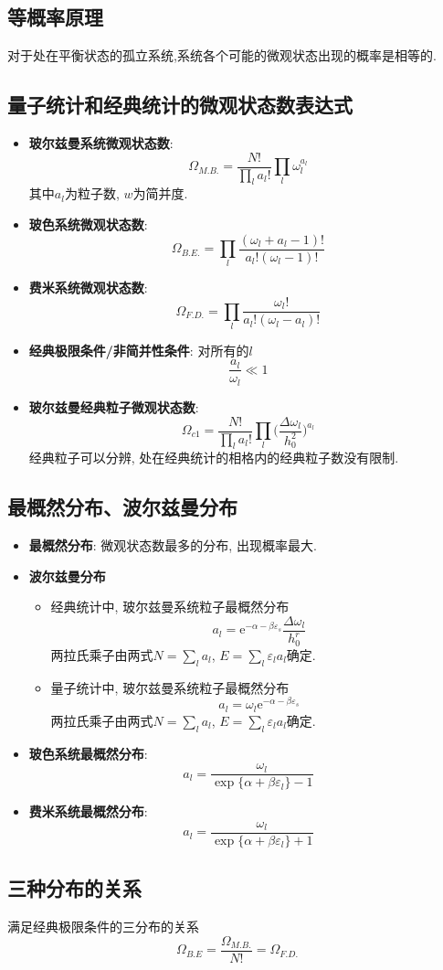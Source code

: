 
\subsection{等概率原理}
对于处在平衡状态的孤立系统,系统各个可能的微观状态出现的概率是相等的.


\subsection{量子统计和经典统计的微观状态数表达式}
\begin{itemize}
\item\textbf{玻尔兹曼系统微观状态数}:
\[
\Omega_{M.B.} = \frac{N!}{\prod\limits_l a_l !}\prod\limits_l \omega_l^{a_l}
\]
其中$a_l$为粒子数, $w$为简并度.
\item\textbf{玻色系统微观状态数}:
\[
\Omega_{B.E.} = \prod\limits_l \frac{(\omega_l + a_l - 1)!}{a_l!(\omega_l-1)!}
\]
\item\textbf{费米系统微观状态数}:
\[
\Omega_{F.D.} = \prod\limits_l \frac{\omega_l !}{a_l!(\omega_l-a_l)!}
\]
\item\textbf{经典极限条件/非简并性条件}: 对所有的$l$
\[
\frac{a_l}{\omega_l}\ll 1
\]
\item\textbf{玻尔兹曼经典粒子微观状态数}:
\[
\Omega_{c1} = \frac{N!}{\prod\limits_{l} a_l !}\prod\limits_l\bigg(\frac{\Delta \omega_l}{h_0^2}\bigg)^{a_l}
\]
经典粒子可以分辨, 处在经典统计的相格内的经典粒子数没有限制.
\end{itemize}


\subsection{最概然分布、波尔兹曼分布}
\begin{itemize}
\item\textbf{最概然分布}: 微观状态数最多的分布, 出现概率最大. 
\item\textbf{波尔兹曼分布}
\begin{itemize}
\item 经典统计中, 玻尔兹曼系统粒子最概然分布
\[
a_l = \mathrm{e}^{-\alpha-\beta \varepsilon_s}\frac{\Delta \omega_l}{h_0^r}
\]
两拉氏乘子由两式$N=\sum_l a_l$, $E=\sum_l \varepsilon_l a_l$确定.
\item 量子统计中, 玻尔兹曼系统粒子最概然分布
\[
a_l = \omega_l\mathrm{e}^{-\alpha-\beta \varepsilon_s}
\]
两拉氏乘子由两式$N=\sum_l a_l$, $E=\sum_l \varepsilon_l a_l$确定.
\end{itemize}
\item\textbf{玻色系统最概然分布}:
\[
a_l = \frac{\omega_l}{\exp\{\alpha+\beta\varepsilon_l\}-1}
\]
\item\textbf{费米系统最概然分布}:
\[
a_l = \frac{\omega_l}{\exp\{\alpha+\beta\varepsilon_l\}+1}
\]
\end{itemize}


\subsection{三种分布的关系}
满足经典极限条件的三分布的关系
\[
\Omega_{B.E} = \frac{\Omega_{M.B.}}{N!} = \Omega_{F.D.}
\]

